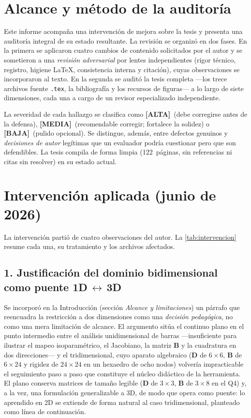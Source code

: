 \documentclass[11pt,a4paper]{article}
\newcommand{\sevalta}{\textcolor{cAlta}{\textbf{[ALTA]}}}
\newcommand{\sevmedia}{\textcolor{cMedia}{\textbf{[MEDIA]}}}
\newcommand{\sevbaja}{\textcolor{cBaja}{\textbf{[BAJA]}}}
\begin{document}
\section{Alcance y método de la auditoría}

Este informe acompaña una intervención de mejora sobre la tesis y presenta una auditoría
integral de su estado resultante. La revisión se organizó en dos fases. En la primera se
aplicaron cuatro cambios de contenido solicitados por el autor y se sometieron a una
\emph{revisión adversarial} por lentes independientes (rigor técnico, registro, higiene
\LaTeX, consistencia interna y citación), cuyas observaciones se incorporaron al texto. En
la segunda se auditó la tesis completa —los trece archivos fuente \texttt{.tex}, la
bibliografía y los recursos de figuras— a lo largo de siete dimensiones, cada una a cargo de
un revisor especializado independiente.

La severidad de cada hallazgo se clasifica como \sevalta\ (debe corregirse antes de la
defensa), \sevmedia\ (recomendable corregir; fortalece la solidez) o \sevbaja\ (pulido
opcional). Se distingue, además, entre defectos genuinos y \emph{decisiones de autor}
legítimas que un evaluador podría cuestionar pero que son defendibles. La tesis compila de
forma limpia (122~páginas, sin referencias ni citas sin resolver) en su estado actual.

\section{Intervención aplicada (junio de 2026)}
\label{sec:intervencion}

La intervención partió de cuatro observaciones del autor. La \autoref{tab:intervencion}
resume cada una, su tratamiento y los archivos afectados.

\subsection*{1. Justificación del dominio bidimensional como puente 1D\,$\leftrightarrow$\,3D}

Se incorporó en la Introducción (sección \emph{Alcance y limitaciones}) un párrafo que
reencuadra la restricción a dos dimensiones como una \emph{decisión pedagógica}, no como una
mera limitación de alcance. El argumento sitúa el continuo plano en el punto intermedio entre
el análisis unidimensional de barras —insuficiente para ilustrar el mapeo isoparamétrico, el
Jacobiano, la matriz $\bm{B}$ y la cuadratura en dos direcciones— y el tridimensional, cuyo
aparato algebraico ($\bm{D}$ de $6\times6$, $\bm{B}$ de $6\times24$ y rigidez de $24\times24$
en un hexaedro de ocho nodos) volvería impracticable el seguimiento paso a paso que constituye
el núcleo didáctico de la herramienta. El plano conserva matrices de tamaño legible
($\bm{D}$ de $3\times3$, $\bm{B}$ de $3\times8$ en el Q4) y, a la vez, una formulación
generalizable a 3D, de modo que opera como puente: lo aprendido en 2D se extiende de forma
natural al caso tridimensional, planteado como línea de continuación.
\end{document}
